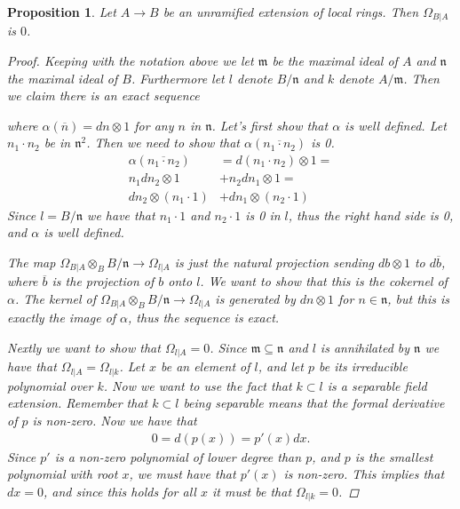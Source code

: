 \documentclass[11pt, a4paper, english]{article}
\newtheorem{prop}[theorem]{Proposition}
\theoremstyle{definition}
\begin{document}
\begin{prop}
Let $A \to B$ be an unramified extension of local rings. Then $\Omega_{B|A}$ is $0$.

\begin{proof}
Keeping with the notation above we let $\mathfrak{m}$ be the maximal ideal of $A$ and $\mathfrak{n}$ the maximal ideal of $B$. Furthermore let $l$ denote $B/\mathfrak{n}$ and $k$ denote $A/\mathfrak{m}$. Then we claim there is an exact sequence
\begin{center}
\end{center}
where $\alpha(\overline{n}) = dn \otimes 1$ for any $n$ in $\mathfrak{n}$. Let's first show that $\alpha$ is well defined. Let $n_1 \cdot n_2$ be in $\mathfrak{n}^2$. Then we need to show that $\alpha(\overline{n_1 \cdot n_2})$ is 0.
\begin{align*}
\alpha(\overline{n_1 \cdot n_2}) &= d(n_1 \cdot n_2) \otimes 1 =\\
n_1 dn_2 \otimes 1 &+ n_2dn_1 \otimes 1 =\\
dn_2 \otimes (n_1 \cdot 1) &+ dn_1 \otimes (n_2 \cdot 1)
\end{align*}
Since $l = B/\mathfrak{n}$ we have that $n_1 \cdot 1$ and $n_2 \cdot 1$ is 0 in $l$, thus the right hand side is 0, and $\alpha$ is well defined.

The map $\Omega_{B|A} \otimes_B B/\mathfrak{n} \to \Omega_{l|A}$ is just the natural projection sending $db \otimes 1$ to $d\overline{b}$, where $\overline{b}$ is the projection of $b$ onto $l$. We want to show that this is the cokernel of $\alpha$. The kernel of $\Omega_{B|A} \otimes_B B/\mathfrak{n} \to \Omega_{l|A}$ is generated by $dn \otimes 1$ for $n \in \mathfrak{n}$, but this is exactly the image of $\alpha$, thus the sequence is exact.

Nextly we want to show that $\Omega_{l|A} = 0$. Since $\mathfrak{m} \subseteq \mathfrak{n}$ and $l$ is annihilated by $\mathfrak{n}$ we have that $\Omega_{l|A} = \Omega_{l|k}$. Let $x$ be an element of $l$, and let $p$ be its irreducible polynomial over $k$. Now we want to use the fact that $k \subset l$ is a separable field extension. Remember that $k \subset l$ being separable means that the formal derivative of $p$ is non-zero. Now we have that
\begin{align*}
0 = d(p(x)) = p'(x)dx.
\end{align*}
Since $p'$ is a non-zero polynomial of lower degree than $p$, and $p$ is the smallest polynomial with root $x$, we must have that $p'(x)$ is non-zero. This implies that $dx=0$, and since this holds for all $x$ it must be that $\Omega_{l|k}=0$.


\end{proof}
\end{prop}
\end{document}
